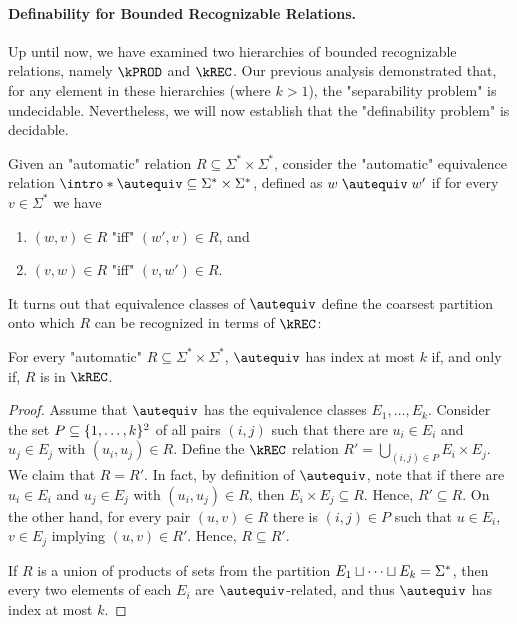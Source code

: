 \paragraph*{Definability for Bounded Recognizable Relations.}
Up until now, we have examined two hierarchies of bounded recognizable relations, namely $\kPROD$ and $\kREC$. 
Our previous analysis demonstrated that, for any element in these hierarchies (where $k>1$), the "separability problem" is undecidable. Nevertheless, 
we will now establish that the "definability problem" is decidable.


\AP Given an "automatic" relation $R \subseteq \Sigma^* \times \Sigma^*$, consider the "automatic" equivalence relation $\intro*\autequiv \subseteq \Sigma^* \times \Sigma^*$, defined as $w \mathrel{\autequiv} w'$ if for every $v \in \Sigma^*$ we have 
\begin{enumerate}
    \item $(w,v) \in R$ "iff" $(w',v) \in R$, and
    \item $(v,w) \in R$ "iff" $(v,w') \in R$.
\end{enumerate}

It turns out that equivalence classes of $\autequiv$ define the coarsest partition onto which $R$ can be recognized in terms of $\kREC$:

\begin{lemma}\AP\label{lem:krec-characterization}
    For every "automatic" $R \subseteq \Sigma^* \times \Sigma^*$, $\autequiv$ has index at most $k$ if, and only if, $R$ is in $\kREC$.
\end{lemma}
\begin{proof}
    Assume that $\autequiv$ has the equivalence classes $E_1, \dotsc, E_k$. Consider the set $P \subseteq \{1, \dotsc, k\}^2$ of all pairs $(i,j)$ such that there are $u_i \in E_i$ and $u_j \in E_j$ with $(u_i,u_j) \in R$. Define the $\kREC$ relation $R' = \bigcup_{(i,j) \in P} E_i \times E_j$. We claim that $R=R'$. 
    In fact, by definition of $\autequiv$, note that if there are $u_i \in E_i$ and $u_j \in E_j$ with $(u_i,u_j) \in R$, then $E_i \times E_j \subseteq R$. Hence, $R' \subseteq R$.
    On the other hand, for every pair $(u,v) \in R$ there is $(i,j) \in P$ such that $u \in E_i$, $v \in E_j$ implying $(u,v) \in R'$.
    Hence, $R \subseteq R'$.

    If $R$ is a union of products of sets from the partition $E_1 \sqcup \dotsb \sqcup E_k = \Sigma^*$, then every two elements of each $E_i$ are $\autequiv$-related, and thus $\autequiv$ has index at most $k$.
\end{proof}

